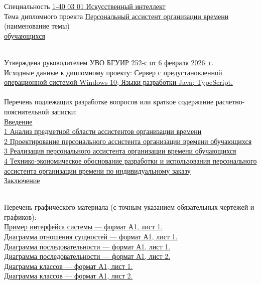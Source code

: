 {\begin{center}
  Специальность \uline{1-40 03 01 Искусственный интеллект}\lineunderscore\\[0.5em]

  Тема дипломного проекта \uline{Персональный ассистент организации времени}\lineunderscore \\
  {\footnotesize\hspace{15em}(наименование темы)}\\[-0.5em]
  \uline{обучающихся}\lineunderscore\\
  \lineunderscore\\[0.5em]
  \end{center}

  Утверждена руководителем УВО \uline{БГУИР} \textnumero  \uline{252-с от 6 февраля 2026~г.}\lineunderscore\\[-0.5em]
  
  Исходные данные к дипломному проекту: \uline{Сервер с предустановленной операционной системой Windows 10; Языки разработки Java; TypeScript.}\lineunderscore\\[0.5em]
  \lineunderscore\\
  
  Перечень подлежащих разработке вопросов или краткое содержание расчетно-пояснительной записки: 
  \lineunderscore\\
  \uline{Введение}\lineunderscore\\
  \uline{1 Анализ предметной области ассистентов организации времени}\lineunderscore\\
  \uline{2 Проектирование персонального ассистента организации времени обучающихся}\lineunderscore\\
  \uline{3 Реализация персонального ассистента организации времени обучающихся}\lineunderscore\\
  \uline{4 Технико-экономическое обоснование разработки и использования персонального ассистента организации времени по индивидуальному заказу}\lineunderscore\\
  \uline{Заключение}\lineunderscore\\
  \lineunderscore\\
  \thispagestyle{empty}

  Перечень графического материала (с точным указанием обязательных чертежей и графиков):
  \lineunderscore\\
  \uline{Пример интерфейса системы --- формат А1, лист 1. }\lineunderscore\\
  \uline{Диаграмма отношения сущностей --- формат А1, лист 1. }\lineunderscore\\
  \uline{Диаграмма последовательности --- формат А1, лист 1. }\lineunderscore\\
  \uline{Диаграмма последовательности --- формат А1, лист 2. }\lineunderscore\\
  \uline{Диаграмма классов --- формат А1, лист 1. }\lineunderscore\\
  \uline{Диаграмма классов --- формат А1, лист 2. }\lineunderscore\\
  \lineunderscore\\

}
